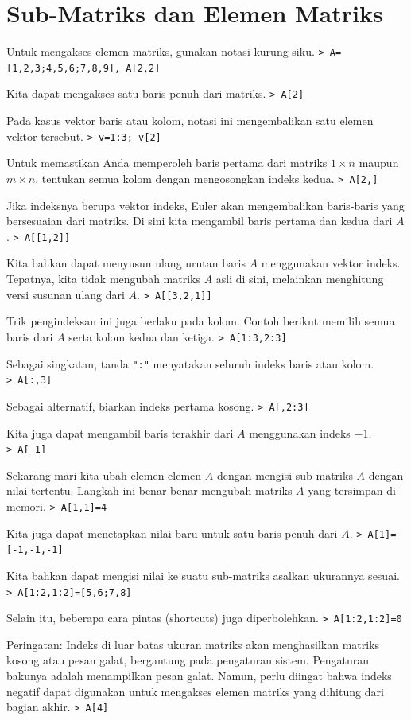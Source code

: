 \documentclass[11pt, a4paper]{article}
\newcommand{\emtcmd}[1]{\noindent\texttt{\textcolor{emtcommand}{>}\ #1}\par\smallskip}
\begin{document}
\section*{Sub-Matriks dan Elemen Matriks}

Untuk mengakses elemen matriks, gunakan notasi kurung siku.
\emtcmd{A=[1,2,3;4,5,6;7,8,9], A[2,2]}

Kita dapat mengakses satu baris penuh dari matriks.
\emtcmd{A[2]}

Pada kasus vektor baris atau kolom, notasi ini mengembalikan satu elemen vektor tersebut.
\emtcmd{v=1:3; v[2]}

Untuk memastikan Anda memperoleh baris pertama dari matriks $1 \times n$ maupun $m \times n$, tentukan semua kolom dengan mengosongkan indeks kedua.
\emtcmd{A[2,]}

Jika indeksnya berupa vektor indeks, Euler akan mengembalikan baris-baris yang bersesuaian dari matriks. Di sini kita mengambil baris pertama dan kedua dari $A$.
\emtcmd{A[[1,2]]}

Kita bahkan dapat menyusun ulang urutan baris $A$ menggunakan vektor indeks. Tepatnya, kita tidak mengubah matriks $A$ asli di sini, melainkan menghitung versi susunan ulang dari $A$.
\emtcmd{A[[3,2,1]]}

Trik pengindeksan ini juga berlaku pada kolom. Contoh berikut memilih semua baris dari $A$ serta kolom kedua dan ketiga.
\emtcmd{A[1:3,2:3]}

Sebagai singkatan, tanda \texttt{":"} menyatakan seluruh indeks baris atau kolom.
\emtcmd{A[:,3]}

Sebagai alternatif, biarkan indeks pertama kosong.
\emtcmd{A[,2:3]}

Kita juga dapat mengambil baris terakhir dari $A$ menggunakan indeks $-1$.
\emtcmd{A[-1]}

Sekarang mari kita ubah elemen-elemen $A$ dengan mengisi sub-matriks $A$ dengan nilai tertentu. Langkah ini benar-benar mengubah matriks $A$ yang tersimpan di memori.
\emtcmd{A[1,1]=4}

Kita juga dapat menetapkan nilai baru untuk satu baris penuh dari $A$.
\emtcmd{A[1]=[-1,-1,-1]}

Kita bahkan dapat mengisi nilai ke suatu sub-matriks asalkan ukurannya sesuai.
\emtcmd{A[1:2,1:2]=[5,6;7,8]}

Selain itu, beberapa cara pintas (shortcuts) juga diperbolehkan.
\emtcmd{A[1:2,1:2]=0}

Peringatan: Indeks di luar batas ukuran matriks akan menghasilkan matriks kosong atau pesan galat, bergantung pada pengaturan sistem. Pengaturan bakunya adalah menampilkan pesan galat. Namun, perlu diingat bahwa indeks negatif dapat digunakan untuk mengakses elemen matriks yang dihitung dari bagian akhir.
\emtcmd{A[4]}
\end{document}
